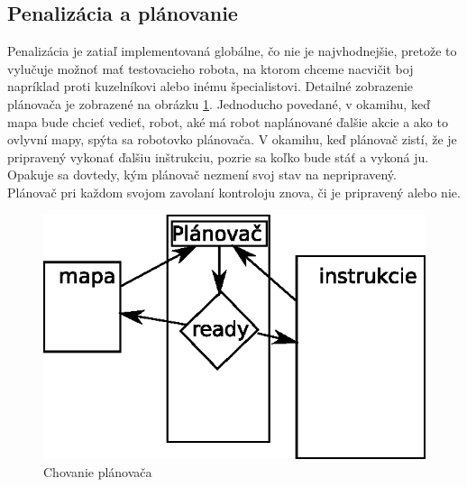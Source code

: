 \subsection{Penalizácia a plánovanie}
Penalizácia je zatiaľ implementovaná globálne, čo nie je najvhodnejšie, pretože to vylučuje možnoť mať testovacieho robota, na ktorom chceme nacvičit boj napríklad proti kuzelníkovi alebo inému špecialistovi. Detailné zobrazenie plánovača je zobrazené na obrázku \ref{fig:sch}. Jednoducho povedané, v okamihu, keď mapa bude chcieť vedieť, robot, aké má robot naplánované ďalšie akcie a ako to ovlyvní mapy, spýta sa robotovko plánovača. V okamihu, keď plánovač zistí, že je pripravený vykonať ďalšiu inštrukciu, pozrie sa koľko bude stáť a vykoná ju. Opakuje sa dovtedy, kým plánovač nezmení svoj stav na nepripravený.\\
Plánovač pri každom svojom zavolaní kontroloju znova, či je pripravený alebo nie.\\
\begin{figure}
\centering
\includegraphics{planovac}
\caption{Chovanie plánovača}
\label{fig:sch}
\end{figure}
